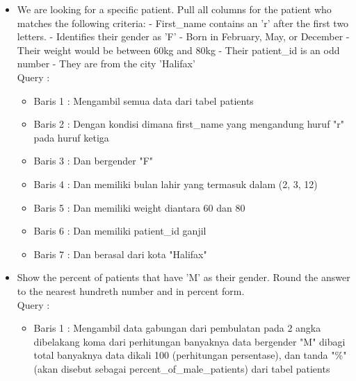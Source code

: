 \documentclass[]{article}
\begin{document}
\begin{itemize}
        \item We are looking for a specific patient. Pull all columns for the patient who matches the following criteria:
        - First\_name contains an 'r' after the first two letters.
        - Identifies their gender as 'F'
        - Born in February, May, or December
        - Their weight would be between 60kg and 80kg
        - Their patient\_id is an odd number
        - They are from the city 'Halifax'
        \\Query :
        
        \begin{itemize}
            \item Baris 1 : Mengambil semua data dari tabel patients
            \item Baris 2 : Dengan kondisi dimana first\_name yang mengandung huruf "r" pada huruf ketiga
            \item Baris 3 : Dan bergender "F"
            \item Baris 4 : Dan memiliki bulan lahir yang termasuk dalam (2, 3, 12)
            \item Baris 5 : Dan memiliki weight diantara 60 dan 80
            \item Baris 6 : Dan memiliki patient\_id ganjil
            \item Baris 7 : Dan berasal dari kota "Halifax"
        \end{itemize}

        \item Show the percent of patients that have 'M' as their gender. Round the answer to the nearest hundreth number and in percent form.
        \\Query :
        
        \begin{itemize}
            \item Baris 1 : Mengambil data gabungan dari pembulatan pada 2 angka dibelakang koma dari perhitungan banyaknya data bergender "M" dibagi total banyaknya data dikali 100 (perhitungan persentase), dan tanda "\%" (akan disebut sebagai percent\_of\_male\_patients) dari tabel patients
        \end{itemize}

    \end{itemize}
\end{document}
